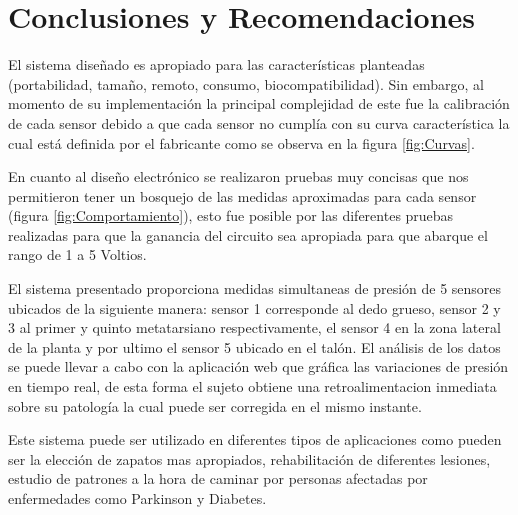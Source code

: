 \chapter{Conclusiones y Recomendaciones} \label{sec:Conclusiones}

El sistema diseñado es apropiado para las características planteadas (portabilidad, tamaño, remoto, consumo, biocompatibilidad). Sin embargo, al momento de su implementación la principal complejidad de este fue la calibración de cada sensor debido a que cada sensor no cumplía con su curva característica la cual está definida por el fabricante como se observa en la figura \ref{fig:Curvas}. 

En cuanto al diseño electrónico se realizaron pruebas muy concisas que nos permitieron tener un bosquejo de las medidas aproximadas para cada sensor (figura \ref{fig:Comportamiento}), esto fue posible por las diferentes pruebas realizadas para que la ganancia del circuito sea apropiada para que abarque el rango de 1 a 5 Voltios.

El sistema presentado proporciona medidas simultaneas de presión de 5 sensores ubicados de la siguiente manera: sensor 1 corresponde al dedo grueso, sensor 2 y 3 al primer y quinto metatarsiano respectivamente, el sensor 4 en la zona lateral de la planta y por ultimo el sensor 5 ubicado en el talón. El análisis de los datos se puede llevar a cabo con la aplicación web que gráfica las variaciones de presión en tiempo real, de esta forma el sujeto obtiene una retroalimentacion inmediata sobre su patología la cual puede ser corregida en el mismo instante.

Este sistema puede ser utilizado en diferentes tipos de aplicaciones como pueden ser la elección de zapatos mas apropiados, rehabilitación de diferentes lesiones, estudio de patrones a la hora de caminar por personas afectadas por enfermedades como Parkinson y Diabetes.
